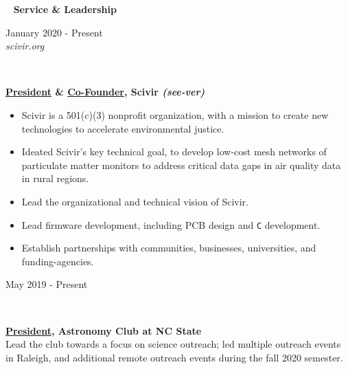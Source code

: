 \documentclass[7.5pt]{article}
\def \primarycolor   {spacecadet}
\def \tertiarycolor  {airforceblue} %
\def \titlerectmin{0.15cm}
\def \titlerectmax{0.35cm}
\def \leftcolwidth{3.10cm}
\def\code#1{\texttt{#1}}
\newcommand{\CPP}
{\code{C\nolinebreak[4]\hspace{-.05em}\raisebox{.22ex}{\footnotesize\bf ++}}}
\newcommand{\cvheader}[1]{
    \tikz{\fill [\primarycolor] (0,\titlerectmin) rectangle (\leftcolwidth,\titlerectmax);} \ 
    \textcolor{\primarycolor}{ \large{\textbf{#1}} } 
}
\newcommand{\cventry}[4]{
    \begin{minipage}[t]{\leftcolwidth} 
        \small{
            \begin{flushright}
                #2\\
                \textcolor{\tertiarycolor}{\textit{#4}}
            \end{flushright}
        }
    \end{minipage} \ \
    \begin{minipage}[t]{\linewidth-\leftcolwidth} \normalsize{\textbf{#1} \\ #3} \end{minipage}
} %
\begin{document}

\cvheader{Service \& Leadership}

\cventry{\underline{President} \& \underline{Co-Founder}, Scivir \textit{(see-ver)}}{January 2020 - Present}{\vspace*{-3.5mm} \begin{itemize}
    \item Scivir is a 501(c)(3) nonprofit organization, with a mission to create new technologies to accelerate environmental justice.
    \item Ideated Scivir's key technical goal, to develop low-cost mesh networks of particulate matter monitors to address critical data gaps in air quality data in rural regions.
    \item Lead the organizational and technical vision of Scivir.
    \item Lead firmware development, including PCB design and \CPP{} development.
    \item Establish partnerships with communities, businesses, universities, and funding-agencies.
\end{itemize}}{scivir.org}

\cventry{\underline{President}, Astronomy Club at NC State}{May 2019 - Present}{Lead the club towards a focus on science outreach; led multiple outreach events in Raleigh, and additional remote outreach events during the fall 2020 semester.}{}

\end{document}
